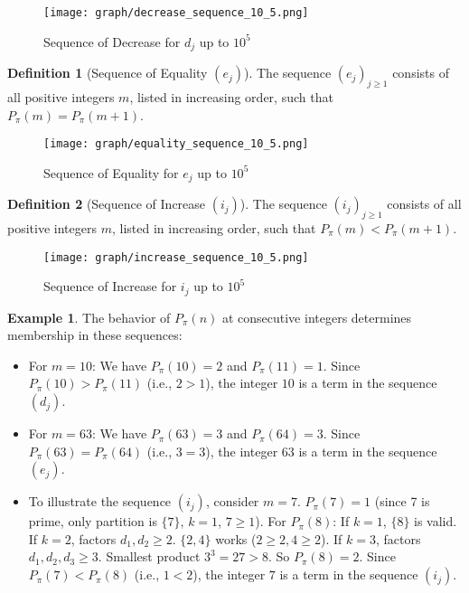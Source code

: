 \documentclass[]{article}
\theoremstyle{plain}%
\theoremstyle{definition}
\newtheorem{defn}{Definition}[section]
\newtheorem{exmp}{Example}[section]
\theoremstyle{remark}
\begin{document}
	\begin{figure}[h]
		\caption{Sequence of Decrease for $d_j$ up to $10^5$}
		\centering
		\texttt{[image: graph/decrease\_sequence\_10\_5.png]}
	\end{figure}
	
	\begin{defn}[Sequence of Equality $(e_j)$]
		The sequence $(e_j)_{j \ge 1}$ consists of all positive integers $m$, listed in increasing order, such that $P_{\pi}(m) = P_{\pi}(m+1)$.
	\end{defn}
	\begin{figure}[h]
		\caption{Sequence of Equality for $e_j$ up to $10^5$}
		\centering
		\texttt{[image: graph/equality\_sequence\_10\_5.png]}
	\end{figure}
	\begin{defn}[Sequence of Increase $(i_j)$]
		The sequence $(i_j)_{j \ge 1}$ consists of all positive integers $m$, listed in increasing order, such that $P_{\pi}(m) < P_{\pi}(m+1)$.
	\end{defn}
	\begin{figure}[h]
		\caption{Sequence of Increase for $i_j$ up to $10^5$}
		\centering
		\texttt{[image: graph/increase\_sequence\_10\_5.png]}
	\end{figure}
	\begin{exmp}
		The behavior of $P_{\pi}(n)$ at consecutive integers determines membership in these sequences:
		\begin{itemize}
			\item For $m=10$: We have $P_{\pi}(10)=2$ and $P_{\pi}(11)=1$. Since $P_{\pi}(10) > P_{\pi}(11)$ (i.e., $2 > 1$), the integer $10$ is a term in the sequence $(d_j)$.
			
			\item For $m=63$: We have $P_{\pi}(63)=3$ and $P_{\pi}(64)=3$. Since $P_{\pi}(63) = P_{\pi}(64)$ (i.e., $3 = 3$), the integer $63$ is a term in the sequence $(e_j)$.
			
			\item To illustrate the sequence $(i_j)$, consider $m=7$.
			$P_{\pi}(7)=1$ (since 7 is prime, only partition is $\{7\}$, $k=1$, $7 \ge 1$).
			For $P_{\pi}(8)$: If $k=1$, $\{8\}$ is valid. If $k=2$, factors $d_1, d_2 \ge 2$. $\{2,4\}$ works ($2\ge 2, 4\ge 2$). If $k=3$, factors $d_1,d_2,d_3 \ge 3$. Smallest product $3^3=27 > 8$. So $P_{\pi}(8)=2$.
			Since $P_{\pi}(7) < P_{\pi}(8)$ (i.e., $1 < 2$), the integer $7$ is a term in the sequence $(i_j)$.
		\end{itemize}
	\end{exmp}
\end{document}
